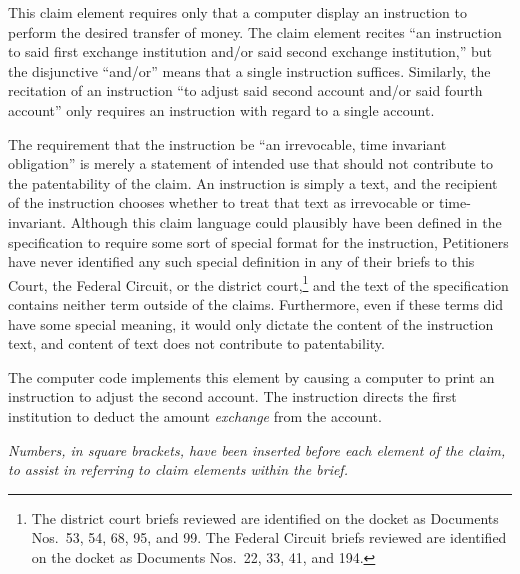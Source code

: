\documentclass{scotus}
\begin{document}
This claim element requires only that a computer display an instruction to
perform the desired transfer of money. The claim element recites ``an
instruction to said first exchange institution and/or said second exchange
institution,'' but the disjunctive ``and/or'' means that a single instruction
suffices. Similarly, the recitation of an instruction ``to adjust said second
account and/or said fourth account'' only requires an instruction with regard to
a single account.

The requirement that the instruction be ``an irrevocable, time invariant
obligation'' is merely a statement of intended use that should not contribute to
the patentability of the claim. An instruction is simply a text, and the
recipient of the instruction chooses whether to treat that text as irrevocable
or time-invariant. Although this claim language could plausibly have been
defined in the specification to require some sort of special format for the
instruction, Petitioners have never identified any such special definition in
any of their briefs to this Court, the Federal Circuit, or the district
court,\footnote{The district court briefs reviewed are identified on the docket
as Documents Nos.\ 53, 54, 68, 95, and 99. The Federal Circuit briefs reviewed
are identified on the docket as Documents Nos.\ 22, 33, 41, and 194.}
and the text of the
specification contains neither term outside of the claims. Furthermore, even if
these terms did have some special meaning, it would only dictate the content of
the instruction text, and content of text does not contribute to patentability.

The computer code implements this element by causing a computer to print an
instruction to adjust the second account. The instruction directs the
first institution to deduct the amount \emph{exchange} from the account.


\emph{Numbers, in square brackets, have been inserted before each element of the
claim, to assist in referring to claim elements within the brief.}

\wholeclaim
\end{document}
